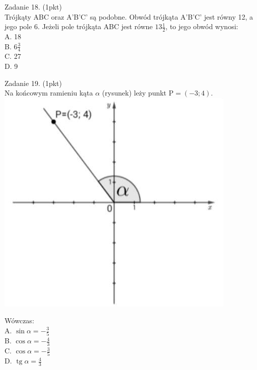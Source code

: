 \documentclass[10pt]{article}
\begin{document}
Zadanie 18. (1pkt)\\
Trójkąty ABC oraz A'B'C' są podobne. Obwód trójkąta A'B'C' jest równy 12, a jego pole 6. Jeżeli pole trójkąta ABC jest równe \(13 \frac{1}{2}\), to jego obwód wynosi:\\
A. 18\\
B. \(6 \frac{3}{4}\)\\
C. 27\\
D. 9

Zadanie 19. (1pkt)\\
Na końcowym ramieniu kąta \(\alpha\) (rysunek) leży punkt \(\mathrm{P}=(-3 ; 4)\).\\
\includegraphics[max width=\textwidth, center]{2024_11_21_87037534e5fdc524263ag-06}

Wówczas:\\
A. \(\sin \alpha=-\frac{3}{5}\)\\
B. \(\cos \alpha=-\frac{4}{3}\)\\
C. \(\cos \alpha=-\frac{3}{5}\)\\
D. \(\operatorname{tg} \alpha=\frac{4}{3}\)
\end{document}
